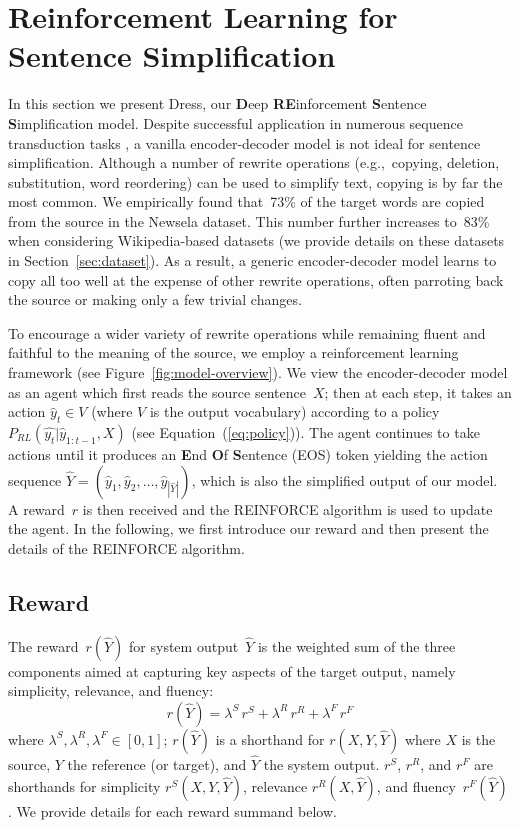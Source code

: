 \documentclass[11pt,letterpaper]{article}
\begin{document}
\section{Reinforcement Learning for Sentence Simplification}
\label{sec:rf}
In this section we present {\sc Dress}, our {\bf D}eep {\bf
  RE}inforcement {\bf S}entence {\bf S}implification model.  Despite
successful application in numerous sequence transduction tasks
\cite{jean2015montreal,chopra-auli-rush:2016:N16-1,xu2015show}, a
vanilla encoder-decoder model is not ideal for sentence
simplification. Although a number of rewrite operations
(e.g.,~copying, deletion, substitution, word reordering) can be used
to simplify text, copying is by far the most common. We empirically
found that~73\% of the target words are copied from the source in the
Newsela dataset. This number further increases to~83\% when
considering Wikipedia-based datasets (we provide details on these
datasets in Section~\ref{sec:dataset}). As a result, a generic
encoder-decoder model learns to copy all too well at the expense of
other rewrite operations, often parroting back the source or making
only a few trivial changes.

To encourage a wider variety of rewrite operations while remaining
fluent and faithful to the meaning of the source, we employ a
reinforcement learning framework (see
Figure~\ref{fig:model-overview}).  We view the encoder-decoder model
as an agent which first reads the source sentence~$X$; then at each
step, it takes an action $\hat{y}_t \in V$ (where $V$ is the output
vocabulary) according to a policy
$P_{RL}(\hat{y_t}|\hat{y}_{1:t-1}, X)$ (see
Equation~(\ref{eq:policy})). The agent continues to take actions until
it produces an \textbf{E}nd {\bf O}f {\bf S}entence (EOS) token
yielding the action sequence
$\hat{Y}=(\hat{y}_1, \hat{y}_2, \dots, \hat{y}_{|\hat{Y}|})$, which is
also the simplified output of our model. A reward~$r$ is then received
and the REINFORCE algorithm \cite{williams1992simple} is used to
update the agent.  In the following, we first introduce our reward and
then present the details of the REINFORCE algorithm.

\subsection{Reward}
\label{sec:reward}

The reward~$r(\hat{Y})$ for system output~$\hat{Y}$ is the weighted sum of
the three components aimed at capturing key aspects of the target
output, namely simplicity, relevance, and fluency:
\begin{equation}
r(\hat{Y}) = \lambda^S \, r^S + \lambda^R \, r^R +  \lambda^F \, r^F
\end{equation}
where $\lambda^S, \lambda^R, \lambda^F \in [0, 1]$; $r(\hat{Y})$ is a
shorthand for $r(X, Y, \hat{Y})$ where $X$ is the source, $Y$ the
reference (or target), and $\hat{Y}$ the system output. $r^S$, $r^R$,
and $r^F$ are shorthands for simplicity $r^S(X, Y, \hat{Y})$,
relevance $r^R(X,\hat{Y})$, and fluency~$r^F(\hat{Y})$. We provide
details for each reward summand below.
\end{document}
